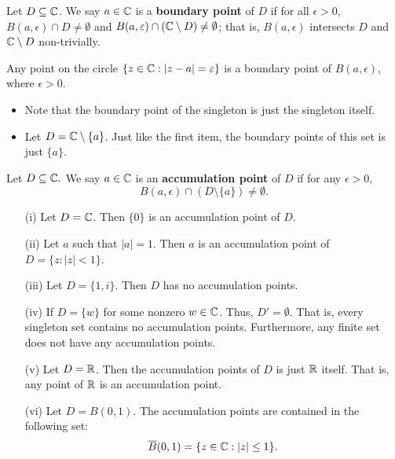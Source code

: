 \documentclass[a4paper]{report}
\begin{document}
\begin{definition}
   Let \( D \subseteq  \mathbb{C}  \). We say \( a \in \mathbb{C}  \) is a \textbf{boundary point} of \( D  \) if for all \( \epsilon > 0  \), \( B(a,\epsilon) \cap D \neq \emptyset \) and \( B(a,\varepsilon) \cap (\mathbb{C} \setminus  D ) \neq \emptyset  \); that is, \( B(a,\epsilon) \) intersects \( D  \) and \( \mathbb{C} \setminus  D   \) non-trivially.  
\end{definition}

\begin{eg}
   Any point on the circle \( \{ z \in \mathbb{C} : | z - a  | = \varepsilon \}  \) is a boundary point of \( B(a,\epsilon) \), where \( \epsilon > 0  \).
\end{eg}

\begin{eg}
    \begin{itemize}
  \item  Note that the boundary point of the singleton is just the singleton itself.
    \item Let \( D = \mathbb{C} \setminus  \{ a  \}  \). Just like the first item, the boundary points of this set is just \( \{ a  \}  \). 
    \end{itemize}
\end{eg}

\begin{definition}
Let \( D \subseteq  \mathbb{C} . \) We say \( a \in \mathbb{C}  \) is an \textbf{accumulation point} of \( D  \) if for any \( \epsilon > 0  \),
\[  B(a,\epsilon) \cap (D \setminus  \{ a \} ) \neq \emptyset. \]

\end{definition}

\begin{eg}
    \begin{enumerate}
        \item[(i)] Let \( D = \mathbb{C}  \). Then \( \{ 0  \}  \) is an accumulation point of \( D  \).
        \item[(ii)] Let \( a  \) such that \( | a  |  = 1  \). Then \( a  \) is an accumulation point of \( D = \{ z : | z | < 1   \}  \).
        \item[(iii)] Let \( D = \{ 1,i \}  \). Then \( D  \) has no accumulation points.
        \item[(iv)] If \( D = \{ w  \}  \) for some nonzero \( w \in \mathbb{C}  \). Thus, \( D' = \emptyset \). That is, every singleton set contains no accumulation points. Furthermore, any finite set does not have any accumulation points.
        \item[(v)] Let \( D = \mathbb{R}  \). Then the accumulation points of \( D  \) is just \( \mathbb{R}  \) itself. That is, any point of \( \mathbb{R}  \) is an accumulation point.
        \item[(vi)] Let \( D = B(0,1) \). The accumulation points are contained in the following set: 
            \[  \overline{B}(0,1) = \{ z \in \mathbb{C} : | z  |  \leq 1  \}. \]
    \end{enumerate}
\end{eg}
\end{document}
